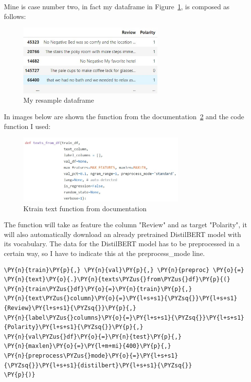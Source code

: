 Mine is case number two, in fact my dataframe in Figure~\ref{fig:fig_24}, is composed as follows:
\begin{figure}[ht!]
\centering
\includegraphics[width=0.65\textwidth]{images/dataframe.jpg}
\caption{My resample dataframe}
\label{fig:fig_24}
\end{figure}
\FloatBarrier

In images below are shown the function from the documentation~\ref{fig:fig_22} and the code function I used:
\begin{figure}[ht!]
\centering
\includegraphics[width=0.75\textwidth]{images/textdf.jpg}
\caption{Ktrain text function from documentation}
\label{fig:fig_22}
\end{figure}
\FloatBarrier
The function will take as feature the column "Review" and as target "Polarity", it will also automatically download an already pretrained DistilBERT model with its vocabulary.
The data for the DistilBERT model has to be preprocessed in a certain way, so I have to indicate this at the preprocess\_mode line.
    \begin{tcolorbox}[breakable, size=fbox, boxrule=1pt, pad at break*=1mm,colback=cellbackground, colframe=cellborder]

\begin{Verbatim}[commandchars=\\\{\},fontsize=\footnotesize]
\PY{n}{train}\PY{p}{,} \PY{n}{val}\PY{p}{,} \PY{n}{preproc} \PY{o}{=} \PY{n}{text}\PY{o}{.}\PY{n}{texts\PYZus{}from\PYZus{}df}\PY{p}{(}
\PY{n}{train\PYZus{}df}\PY{o}{=}\PY{n}{train}\PY{p}{,}
\PY{n}{text\PYZus{}column}\PY{o}{=}\PY{l+s+s1}{\PYZsq{}}\PY{l+s+s1}{Review}\PY{l+s+s1}{\PYZsq{}}\PY{p}{,}
\PY{n}{label\PYZus{}columns}\PY{o}{=}\PY{l+s+s1}{\PYZsq{}}\PY{l+s+s1}{Polarity}\PY{l+s+s1}{\PYZsq{}}\PY{p}{,}
\PY{n}{val\PYZus{}df}\PY{o}{=}\PY{n}{test}\PY{p}{,}
\PY{n}{maxlen}\PY{o}{=}\PY{l+m+mi}{400}\PY{p}{,}
\PY{n}{preprocess\PYZus{}mode}\PY{o}{=}\PY{l+s+s1}{\PYZsq{}}\PY{l+s+s1}{distilbert}\PY{l+s+s1}{\PYZsq{}}
\PY{p}{)}
\end{Verbatim}
\end{tcolorbox}

